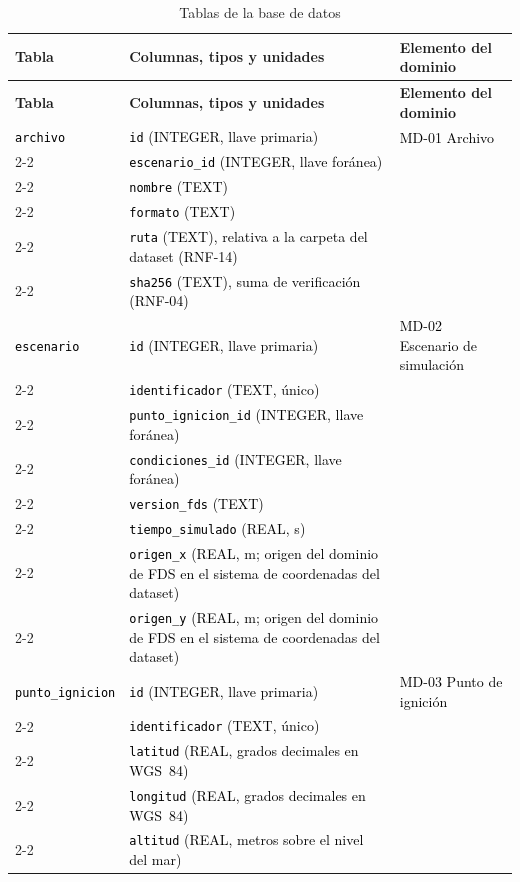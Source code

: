 \begin{longtable}{|p{\bdA}|p{\bdB}|p{\bdC}|}
  \caption{Tablas de la base de datos}\label{tab:bd}\tabularnewline
  \hline
  \textbf{Tabla} & \textbf{Columnas, tipos y unidades} & \raggedright\textbf{Elemento del dominio}\tabularnewline\hline
  \endfirsthead
  \hline
  \textbf{Tabla} & \textbf{Columnas, tipos y unidades} & \raggedright\textbf{Elemento del dominio}\tabularnewline\hline
  \endhead
  \textcolor{black}{\texttt{archivo}} & \textcolor{black}{\texttt{id} (INTEGER, llave primaria)} & \textcolor{black}{MD-01 Archivo}\tabularnewline\cline{2-2}
 & \textcolor{black}{\texttt{escenario\_id} (INTEGER, llave foránea)} & \tabularnewline\cline{2-2}
 & \textcolor{black}{\texttt{nombre} (TEXT)} & \tabularnewline\cline{2-2}
 & \textcolor{black}{\texttt{formato} (TEXT)} & \tabularnewline\cline{2-2}
 & \textcolor{black}{\texttt{ruta} (TEXT), relativa a la \textcolor{black}{carpeta del dataset} (RNF-14)} & \tabularnewline\cline{2-2}
 & \textcolor{black}{\texttt{sha256} (TEXT), suma de verificación (RNF-04)} & \tabularnewline\hline
  \textcolor{black}{\texttt{escenario}} & \textcolor{black}{\texttt{id} (INTEGER, llave primaria)} & \textcolor{black}{MD-02 Escenario de simulación}\tabularnewline\cline{2-2}
 & \textcolor{black}{\texttt{identificador} (TEXT, único)} & \tabularnewline\cline{2-2}
 & \textcolor{black}{\texttt{punto\_ignicion\_id} (INTEGER, llave foránea)} & \tabularnewline\cline{2-2}
 & \textcolor{black}{\texttt{condiciones\_id} (INTEGER, llave foránea)} & \tabularnewline\cline{2-2}
 & \textcolor{black}{\texttt{version\_fds} (TEXT)} & \tabularnewline\cline{2-2}
 & \textcolor{black}{\texttt{tiempo\_simulado} (REAL, s)} & \tabularnewline\cline{2-2}
 & \textcolor{black}{\texttt{origen\_x} (REAL, m; origen del dominio de FDS en el sistema de \textcolor{black}{coordenadas del dataset})} & \tabularnewline\cline{2-2}
 & \textcolor{black}{\texttt{origen\_y} (REAL, m; origen del dominio de FDS en el sistema de coordenadas \textcolor{black}{del dataset})} & \tabularnewline\hline
  \textcolor{black}{\texttt{punto\_ignicion}} & \textcolor{black}{\texttt{id} (INTEGER, llave primaria)} & \textcolor{black}{MD-03 Punto de ignición}\tabularnewline\cline{2-2}
 & \textcolor{black}{\texttt{identificador} (TEXT, único)} & \tabularnewline\cline{2-2}
 & \textcolor{black}{\texttt{latitud} (REAL, grados decimales en WGS~84)} & \tabularnewline\cline{2-2} & \textcolor{black}{\texttt{longitud} (REAL, grados decimales en WGS~84)} & \tabularnewline\cline{2-2}
 & \textcolor{black}{\texttt{altitud} (REAL, metros sobre el nivel del mar)} & \tabularnewline\hline

\end{longtable}
